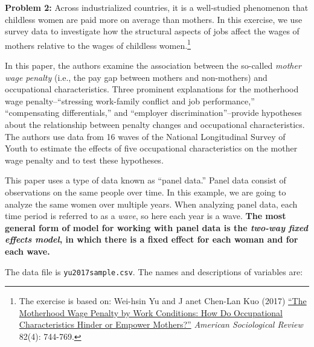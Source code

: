 \documentclass[11pt]{article}
\begin{document}
\vspace{7mm}
\noindent \textbf{Problem 2:} Across industrialized countries, it is a well-studied phenomenon 
that childless women are paid more on average than mothers. In this exercise, 
we use survey data to investigate how the structural aspects of jobs affect 
the wages of mothers relative to the wages of childless women.\footnote{The exercise is based on: Wei-hsin Yu and J
anet Chen-Lan Kuo (2017) \href{https://doi.org/10.1177/0003122417712729}{``The Motherhood Wage Penalty by Work 
Conditions: How Do Occupational Characteristics Hinder or 
Empower Mothers?''}
\textit{American Sociological Review} 82(4): 744-769.}

In this paper, the authors examine the association between 
the so-called \textit{mother wage penalty} (i.e., the pay gap between mothers 
and non-mothers) and occupational characteristics. Three prominent 
explanations for the motherhood wage penalty--``stressing work-family conflict 
and job performance,'' ``compensating differentials,'' and ``employer 
discrimination''--provide hypotheses about the relationship 
between penalty changes and occupational characteristics.
The authors use data from 16 waves of the National Longitudinal 
Survey of Youth to estimate the effects of five occupational 
characteristics on the mother wage penalty and to test these 
hypotheses. 

This paper uses a type of data known as ``panel data.'' Panel data consist of 
observations on the same people over time. In this example, we are going to 
analyze the same women over multiple years. When analyzing panel data, each 
time period is referred to as a \textit{wave}, so here each year is a wave. 
{\bf The most general form of model for working with panel data is the 
\textit{two-way fixed effects model}, in which there is a fixed effect for each 
woman and for each wave.}

The data file is {\tt yu2017sample.csv}. The names 
and descriptions of variables are:
\end{document}
